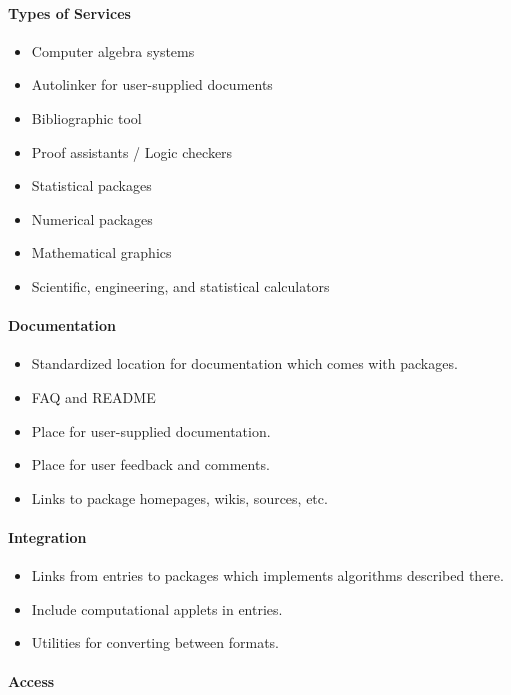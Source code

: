 \paragraph{Types of Services}

\begin{itemize}
\item
  Computer algebra systems
\item
  Autolinker for user-supplied documents
\item
  Bibliographic tool
\item
  Proof assistants / Logic checkers
\item
  Statistical packages
\item
  Numerical packages
\item
  Mathematical graphics
\item
  Scientific, engineering, and statistical calculators
\end{itemize}

\paragraph{Documentation}

\begin{itemize}
\item
  Standardized location for documentation which comes with packages.
\item
  FAQ and README
\item
  Place for user-supplied documentation.
\item
  Place for user feedback and comments.
\item
  Links to package homepages, wikis, sources, etc.
\end{itemize}

\paragraph{Integration}

\begin{itemize}
\item
  Links from entries to packages which implements algorithms described
  there.
\item
  Include computational applets in entries.
\item
  Utilities for converting between formats.
\end{itemize}

\paragraph{Access}

